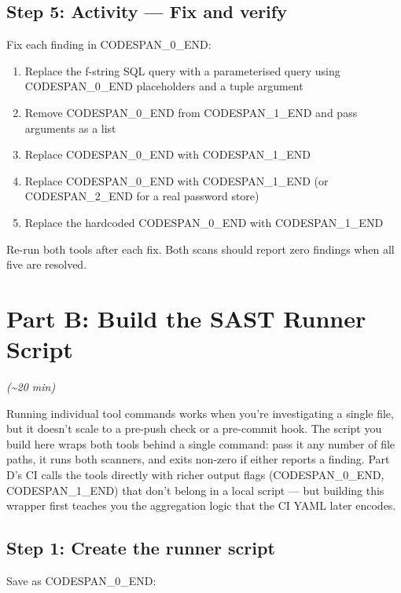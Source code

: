 \documentclass[11pt,a4paper]{book}
\begin{document}
\subsection{Step 5: Activity --- Fix and verify}

Fix each finding in CODESPAN\_0\_END:

\begin{enumerate}
  \item Replace the f-string SQL query with a parameterised query using CODESPAN\_0\_END placeholders and a tuple argument
  \item Remove CODESPAN\_0\_END from CODESPAN\_1\_END and pass arguments as a list
  \item Replace CODESPAN\_0\_END with CODESPAN\_1\_END
  \item Replace CODESPAN\_0\_END with CODESPAN\_1\_END (or CODESPAN\_2\_END for a real password store)
  \item Replace the hardcoded CODESPAN\_0\_END with CODESPAN\_1\_END
\end{enumerate}

Re-run both tools after each fix. Both scans should report zero findings when all five are resolved.

\medskip

\section{Part B: Build the SAST Runner Script}

\textit{(\textasciitilde{}20 min)}

Running individual tool commands works when you're investigating a single file, but it doesn't scale to a pre-push check or a pre-commit hook. The script you build here wraps both tools behind a single command: pass it any number of file paths, it runs both scanners, and exits non-zero if either reports a finding. Part D's CI calls the tools directly with richer output flags (CODESPAN\_0\_END, CODESPAN\_1\_END) that don't belong in a local script --- but building this wrapper first teaches you the aggregation logic that the CI YAML later encodes.

\subsection{Step 1: Create the runner script}

Save as CODESPAN\_0\_END:
\end{document}
